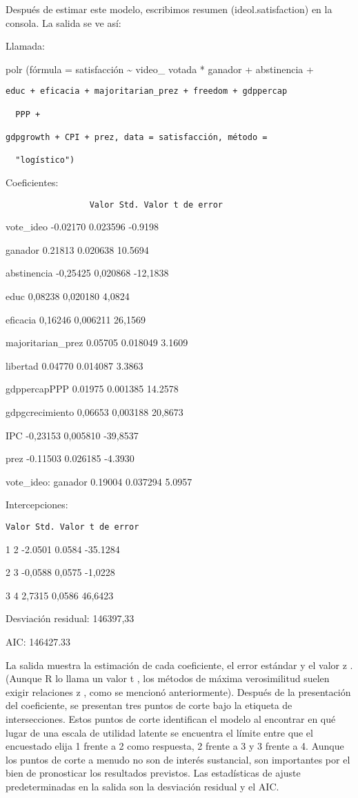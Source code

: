\documentclass[
]{book}
\begin{document}
Después de estimar este modelo, escribimos resumen (ideol.satisfaction) en la consola. La salida se ve así:

Llamada:

polr (fórmula = satisfacción \textasciitilde{} video\_ votada * ganador + abstinencia +

\begin{verbatim}
educ + eficacia + majoritarian_prez + freedom + gdppercap

  PPP +

gdpgrowth + CPI + prez, data = satisfacción, método =

  "logístico")
\end{verbatim}

Coeficientes:

\begin{verbatim}
                 Valor Std. Valor t de error
\end{verbatim}

vote\_ideo -0.02170 0.023596 -0.9198

ganador 0.21813 0.020638 10.5694

abstinencia -0,25425 0,020868 -12,1838

educ 0,08238 0,020180 4,0824

eficacia 0,16246 0,006211 26,1569

majoritarian\_prez 0.05705 0.018049 3.1609

libertad 0.04770 0.014087 3.3863

gdppercapPPP 0.01975 0.001385 14.2578

gdpgcrecimiento 0,06653 0,003188 20,8673

IPC -0,23153 0,005810 -39,8537

prez -0.11503 0.026185 -4.3930

vote\_ideo: ganador 0.19004 0.037294 5.0957

Intercepciones:

\begin{verbatim}
Valor Std. Valor t de error
\end{verbatim}

1 \textbar{} 2 -2.0501 0.0584 -35.1284

2 \textbar{} 3 -0,0588 0,0575 -1,0228

3 \textbar{} 4 2,7315 0,0586 46,6423

Desviación residual: 146397,33

AIC: 146427.33

La salida muestra la estimación de cada coeficiente, el error estándar y el valor z . (Aunque R lo llama un valor t , los métodos de máxima verosimilitud suelen exigir relaciones z , como se mencionó anteriormente). Después de la presentación del coeficiente, se presentan tres puntos de corte bajo la etiqueta de intersecciones. Estos puntos de corte identifican el modelo al encontrar en qué lugar de una escala de utilidad latente se encuentra el límite entre que el encuestado elija 1 frente a 2 como respuesta, 2 frente a 3 y 3 frente a 4. Aunque los puntos de corte a menudo no son de interés sustancial, son importantes por el bien de pronosticar los resultados previstos. Las estadísticas de ajuste predeterminadas en la salida son la desviación residual y el AIC.
\end{document}
